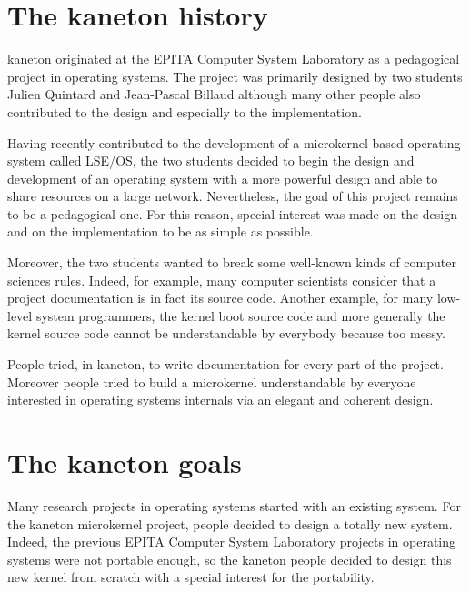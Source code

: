 \begin{multicols}{2}

%
%

\section{The kaneton history}

kaneton originated at the EPITA Computer System Laboratory as a pedagogical
project in operating systems. The project was primarily designed by two
students Julien Quintard and Jean-Pascal Billaud although many other people
also contributed to the design and especially to the implementation.

Having recently contributed to the development of a microkernel based
operating system called LSE/OS, the two students decided to begin the
design and development of an operating system with a more powerful design
and able to share resources on a large network. Nevertheless, the goal of
this project remains to be a pedagogical one. For this reason, special
interest was made on the design and on the implementation to be as
simple as possible.

Moreover, the two students wanted to break some well-known kinds of
computer sciences rules. Indeed, for example, many computer scientists
consider that a project documentation is in fact its source code.
Another example, for many low-level system programmers, the kernel boot
source code and more generally the kernel source code cannot be
understandable by everybody because too messy.

People tried, in kaneton, to write documentation for every part of the
project. Moreover people tried to build a microkernel understandable
by everyone interested in operating systems internals via an elegant
and coherent design.

%
%

\section{The kaneton goals}

Many research projects in operating systems started with an existing system.
For the kaneton microkernel project, people decided to design a totally
new system. Indeed, the previous EPITA Computer System Laboratory projects in
operating systems were not portable enough, so the kaneton people decided
to design this new kernel from scratch with a special interest for the
portability.


\end{multicols}
